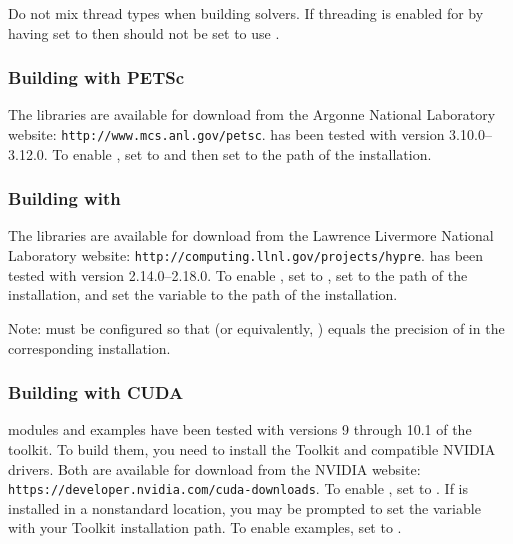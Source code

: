 \noindent Do not mix thread types when building {\sundials} solvers.  If
threading is enabled for {\sundials} by having  set to
 then {\superludist} should not be set to use {\openmp}.{\warn}

\subsubsection*{Building with PETSc}
\label{ss:building_with_petsc}
The {\petsc} libraries are available for download from the Argonne National
Laboratory website: {\tt http://www.mcs.anl.gov/petsc}. {\sundials} has been
tested with {\petsc} version 3.10.0--3.12.0. To enable {\petsc}, set
 to  and then set  to the path of the
{\petsc} installation.


\subsubsection*{Building with {\hypre}}
The {\hypre} libraries are available for download from the Lawrence Livermore
National Laboratory website: {\tt http://computing.llnl.gov/projects/hypre}.
{\sundials} has been tested with {\hypre} version 2.14.0--2.18.0.  To enable
{\hypre}, set   to , set  to
the  path of the {\hypre} installation, and set the variable
 to the  path of the {\hypre} installation.

Note: {\sundials} must be configured so that  (or
equivalently, ) equals the precision of
 in the corresponding {\hypre} installation.


\subsubsection*{Building with CUDA}
{\sundials} {\cuda} modules and examples have been tested with versions 9
through 10.1 of the {\cuda} toolkit. To build them, you need to install the
Toolkit and compatible NVIDIA drivers. Both are available for download from the
NVIDIA website: {\tt https://developer.nvidia.com/cuda-downloads}. To enable
{\cuda}, set  to . If {\cuda} is installed in a
nonstandard location, you may be prompted to set the variable
 with your {\cuda} Toolkit installation path. To
enable {\cuda} examples, set  to .


